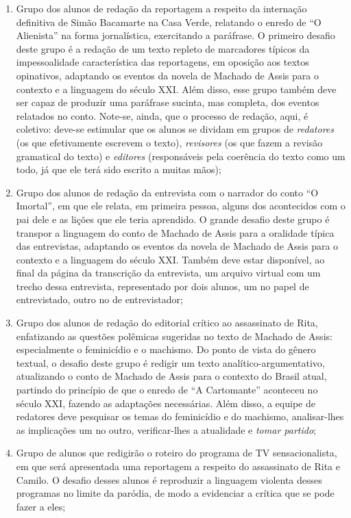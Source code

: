 \documentclass{extarticle}
\begin{document}
\begin{enumerate}
\item Grupo dos alunos de redação da reportagem a respeito da internação
definitiva de Simão Bacamarte na Casa Verde, relatando o enredo de ``O
Alienista'' na forma jornalística, exercitando a paráfrase. O primeiro
desafio deste grupo é a redação de um texto repleto de marcadores
típicos da impessoalidade característica das reportagens, em oposição
aos textos opinativos, adaptando os eventos da novela de Machado de
Assis para o contexto e a linguagem do século XXI. Além disso, esse
grupo também deve ser capaz de produzir uma paráfrase sucinta, mas
completa, dos eventos relatados no conto. Note-se, ainda, que o processo
de redação, aqui, é coletivo: deve-se estimular que os alunos se dividam
em grupos de \emph{redatores} (os que efetivamente escrevem o texto),
\emph{revisores} (os que fazem a revisão gramatical do texto) e
\emph{editores} (responsáveis pela coerência do texto como um todo, já
que ele terá sido escrito a muitas mãos);

\item Grupo dos alunos de redação da entrevista com o narrador do conto ``O
Imortal'', em que ele relata, em primeira pessoa, alguns dos acontecidos
com o pai dele e as lições que ele teria aprendido. O grande desafio
deste grupo é transpor a linguagem do conto de Machado de Assis para a
oralidade típica das entrevistas, adaptando os eventos da novela de
Machado de Assis para o contexto e a linguagem do século XXI. Também
deve estar disponível, ao final da página da transcrição da entrevista,
um arquivo virtual com um trecho dessa entrevista, representado por dois
alunos, um no papel de entrevistado, outro no de entrevistador;

\item Grupo dos alunos de redação do editorial crítico ao assassinato de
Rita, enfatizando as questões polêmicas sugeridas no texto de Machado de
Assis: especialmente o feminicídio e o machismo. Do ponto de vista do
gênero textual, o desafio deste grupo é redigir um texto
analítico-argumentativo, atualizando o conto de Machado de Assis para o
contexto do Brasil atual, partindo do princípio de que o enredo de ``A
Cartomante'' aconteceu no século XXI, fazendo as adaptações necessárias.
Além disso, a equipe de redatores deve pesquisar os temas do feminicídio
e do machismo, analisar-lhes as implicações um no outro, verificar-lhes
a atualidade e \emph{tomar partido};

\item Grupo de alunos que redigirão o roteiro do programa de TV
sensacionalista, em que será apresentada uma reportagem a respeito do
assassinato de Rita e Camilo. O desafio desses alunos é reproduzir a
linguagem violenta desses programas no limite da paródia, de modo a
evidenciar a crítica que se pode fazer a eles;


\end{enumerate}
\end{document}
